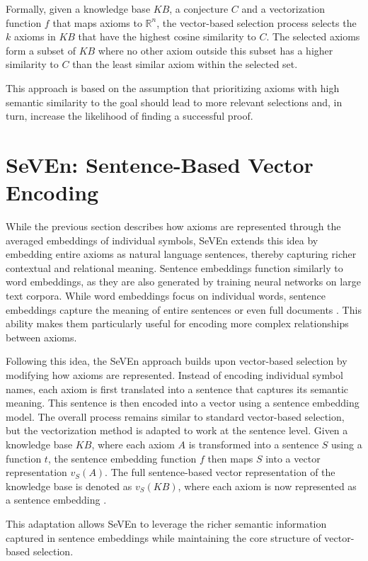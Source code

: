 \documentclass[english,version-2020-11]{uzl-thesis}
\begin{document}
Formally, given a knowledge base \( KB \), a conjecture \( C \) and a vectorization function \( f \) that maps axioms to \( \mathbb{R}^n \), the vector-based selection process selects the \( k \) axioms in \( KB \) that have the highest cosine similarity to \( C \). The selected axioms form a subset of \( KB \) where no other axiom outside this subset has a higher similarity to \( C \) than the least similar axiom within the selected set.

This approach is based on the assumption that prioritizing axioms with high semantic similarity to the goal should lead to more relevant selections and, in turn, increase the likelihood of finding a successful proof.


\section{SeVEn: Sentence-Based Vector Encoding}

While the previous section describes how axioms are represented through the averaged embeddings of individual symbols, SeVEn extends this idea by embedding entire axioms as natural language sentences, thereby capturing richer contextual and relational meaning. Sentence embeddings function similarly to word embeddings, as they are also generated by training neural networks on large text corpora. While word embeddings focus on individual words, sentence embeddings capture the meaning of entire sentences or even full documents \cite{Kiros2015SkipThought}. This ability makes them particularly useful for encoding more complex relationships between axioms.

Following this idea, the SeVEn approach builds upon vector-based selection by modifying how axioms are represented. Instead of encoding individual symbol names, each axiom is first translated into a sentence that captures its semantic meaning. This sentence is then encoded into a vector using a sentence embedding model. The overall process remains similar to standard vector-based selection, but the vectorization method is adapted to work at the sentence level. Given a knowledge base \( KB \), where each axiom \( A \) is transformed into a sentence \( S \) using a function \( t \), the sentence embedding function \( f \) then maps \( S \) into a vector representation \( v_S(A) \). The full sentence-based vector representation of the knowledge base is denoted as \( v_S(KB) \), where each axiom is now represented as a sentence embedding \cite{Schon2024}.

This adaptation allows SeVEn to leverage the richer semantic information captured in sentence embeddings while maintaining the core structure of vector-based selection.
\end{document}
